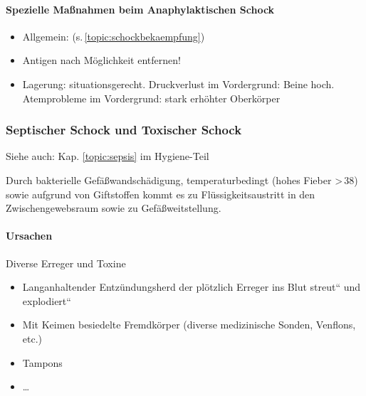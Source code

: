 \begin{gMassnahmenEnv}
    \paragraph{Spezielle Ma{\ss}nahmen beim
    Anaphylaktischen Schock}
    
    \begin{itemize}
        \item Allgemein: 
        (s.\,\ref{topic:schockbekaempfung})
        \item Antigen  nach M\"oglichkeit entfernen!
        \item Lagerung: situationsgerecht. Druckverlust im Vordergrund: Beine
        hoch.
        Atemprobleme im Vordergrund: stark erh\"ohter Oberk\"orper
    \end{itemize}
\end{gMassnahmenEnv}



\subsubsection{Septischer Schock und Toxischer Schock}
\label{topic:schock-septischer}Siehe auch: Kap.
\ref{topic:sepsis} im Hygiene-Teil 


Durch bakterielle Gef\"a{\ss}wandsch\"adigung, temperaturbedingt (hohes
Fieber {\textgreater}\,38{\textcelsius}) sowie aufgrund von
Giftstoffen kommt es zu Fl\"ussigkeitsaustritt in den Zwischen\-gewebs\-raum sowie
zu Gef\"a{\ss}weitstellung.

\paragraph{Ursachen}

Diverse Erreger und Toxine

\begin{itemize}
    \item Langanhaltender Entz\"undungsherd der pl\"otzlich Erreger
    {\quotedblbase}ins Blut streut{\textquotedblleft} und
    {\quotedblbase}explodiert{\textquotedblleft}
    \item Mit Keimen besiedelte Fremdk\"orper (diverse
    medizinische Sonden, Venflons, etc.)
    \item Tampons
    \item \ldots
\end{itemize}

